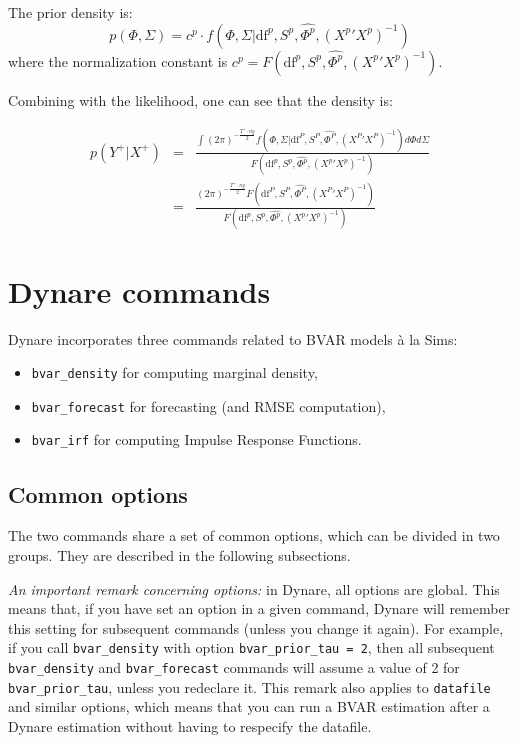 \documentclass[11pt,a4paper]{article}
\newcommand{\df}{\text{df}}
\begin{document}
The prior density is:
$$p(\Phi, \Sigma) = c^p \cdot f(\Phi,\Sigma | \df^p,S^p,\hat{\Phi^p},({X^p}'X^p)^{-1})$$
where the normalization constant is $c^p = F(\df^p,S^p,\hat{\Phi^p},({X^p}'X^p)^{-1})$.



Combining with the likelihood, one can see that the density is:

\begin{eqnarray*}
p(Y^+ | X^+) & = & \frac{\int (2\pi)^{-\frac{T^+\cdot ny}{2}} f(\Phi,\Sigma | \df^P,S^P,\hat{\Phi^P},({X^P}'X^P)^{-1})d\Phi d\Sigma}{F(\df^p,S^p,\hat{\Phi^p},({X^p}'X^p)^{-1})} \\
& = & \frac{(2\pi)^{-\frac{T^+\cdot ny}{2}} F(\df^P,S^P,\hat{\Phi^P},({X^P}'X^P)^{-1})}{F(\df^p,S^p,\hat{\Phi^p},({X^p}'X^p)^{-1})}
\end{eqnarray*}

\section{Dynare commands}
\label{dynare-commands}

Dynare incorporates three commands related to BVAR models \`a la Sims:
\begin{itemize}
\item \texttt{bvar\_density} for computing marginal density,
\item \texttt{bvar\_forecast} for forecasting (and RMSE computation),
\item \texttt{bvar\_irf} for computing Impulse Response Functions.
\end{itemize}

\subsection{Common options}

The two commands share a set of common options, which can be divided in two groups. They are described in the following subsections.

\emph{An important remark concerning options:} in Dynare, all options are global. This means that, if you have set an option in a given command, Dynare will remember this setting for subsequent commands (unless you change it again). For example, if you call \texttt{bvar\_density} with option \texttt{bvar\_prior\_tau = 2}, then all subsequent \texttt{bvar\_density} and \texttt{bvar\_forecast} commands will assume a value of 2 for \texttt{bvar\_prior\_tau}, unless you redeclare it. This remark also applies to \texttt{datafile} and similar options, which means that you can run a BVAR estimation after a Dynare estimation without having to respecify the datafile.
\end{document}
